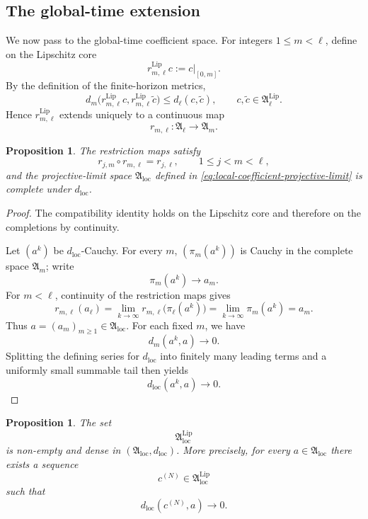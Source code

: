 \documentclass[12pt,oneside, reqno]{amsart}
\newtheorem{proposition}[theorem]{Proposition}
\numberwithin{equation}{section}
\begin{document}
	\subsection{The global-time extension}
	
	We now pass to the global-time coefficient space. For integers
	$1\leq m<\ell$, define on the Lipschitz core
	\[
	r_{m,\ell}^{\mathrm{Lip}}c
	:=
	c|_{[0,m]}.
	\]
	By the definition of the finite-horizon metrics,
	\begin{equation}
		\label{eq:restriction-metric-contraction}
		d_m\bigl(
		r_{m,\ell}^{\mathrm{Lip}}c,
		r_{m,\ell}^{\mathrm{Lip}}\widetilde c
		\bigr)
		\leq
		d_\ell(c,\widetilde c),
		\qquad
		c,\widetilde c\in\mathfrak A_\ell^{\mathrm{Lip}}.
	\end{equation}
	Hence $r_{m,\ell}^{\mathrm{Lip}}$ extends uniquely to a continuous map
	\[
	r_{m,\ell}:\mathfrak A_\ell\longrightarrow\mathfrak A_m.
	\]
	
	\begin{proposition}
		\label{prop:restriction-projective-completeness}
		The restriction maps satisfy
		\[
		r_{j,m}\circ r_{m,\ell}
		=
		r_{j,\ell},
		\qquad
		1\leq j<m<\ell,
		\]
		and the projective-limit space
		$\mathfrak A_{\mathrm{loc}}$ defined in
		\eqref{eq:local-coefficient-projective-limit} is complete under
		$d_{\mathrm{loc}}$.
	\end{proposition}
	
	\begin{proof}
		The compatibility identity holds on the Lipschitz core and therefore
		on the completions by continuity.
		
		Let $(a^k)$ be $d_{\mathrm{loc}}$-Cauchy. For every $m$,
		$(\pi_m(a^k))$ is Cauchy in the complete space $\mathfrak A_m$;
		write
		\[
		\pi_m(a^k)\longrightarrow a_m.
		\]
		For $m<\ell$, continuity of the restriction maps gives
		\[
		r_{m,\ell}(a_\ell)
		=
		\lim_{k\to\infty}
		r_{m,\ell}\bigl(\pi_\ell(a^k)\bigr)
		=
		\lim_{k\to\infty}\pi_m(a^k)
		=
		a_m.
		\]
		Thus $a=(a_m)_{m\geq1}\in\mathfrak A_{\mathrm{loc}}$.
		For each fixed  \(m\), we have
		\[
		d_m(a^k,a)\longrightarrow0.
		\]
		Splitting the defining series for \(d_{\mathrm{loc}}\) into finitely
		many leading terms and a uniformly small summable tail then yields
		\[
		d_{\mathrm{loc}}(a^k,a)\longrightarrow0.
		\]
		
	\end{proof}
	
	
	
	\begin{proposition}
		\label{prop:global-lipschitz-core-density}
		The set
		\[
		\mathfrak A_{\mathrm{loc}}^{\mathrm{Lip}}
		\]
		is non-empty and dense in
		\((\mathfrak A_{\mathrm{loc}},d_{\mathrm{loc}})\).
		More precisely, for every
		\(a\in\mathfrak A_{\mathrm{loc}}\) there exists a sequence
		\[
		c^{(N)}\in\mathfrak A_{\mathrm{loc}}^{\mathrm{Lip}}
		\]
		such that
		\[
		d_{\mathrm{loc}}(c^{(N)},a)\longrightarrow0.
		\]
	\end{proposition}
	
\end{document}
